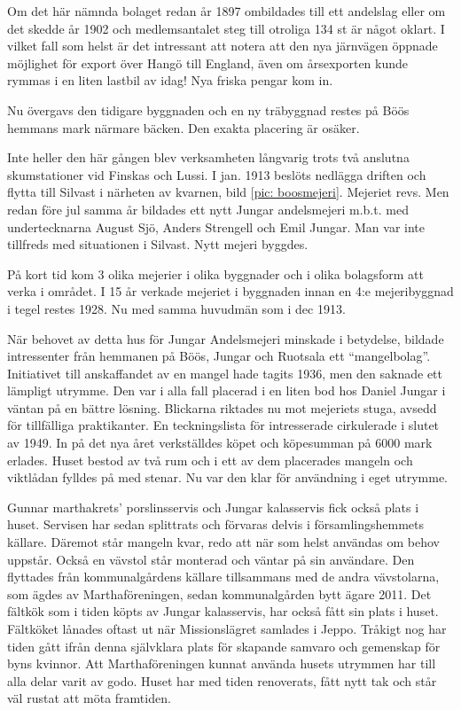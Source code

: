 Om det här nämnda bolaget redan år 1897 ombildades till ett andelslag eller om det skedde år 1902 och medlemsantalet steg till otroliga 134 st är något oklart. I vilket fall som helst är det intressant att notera att den nya järnvägen öppnade möjlighet för export över Hangö till England, även om årsexporten kunde rymmas i en liten lastbil av idag! Nya friska pengar kom in.

Nu övergavs den tidigare byggnaden och en ny träbyggnad restes på Böös hemmans mark närmare bäcken. Den exakta placering är osäker.

Inte heller den här gången blev verksamheten långvarig trots två anslutna skumstationer vid Finskas och Lussi. I jan. 1913 beslöts nedlägga driften och flytta till Silvast i närheten av kvarnen, bild \ref{pic: boosmejeri}. Mejeriet revs. Men redan före jul samma år bildades ett nytt Jungar andelsmejeri m.b.t. med undertecknarna August Sjö, Anders Strengell och Emil Jungar. Man var inte tillfreds med situationen i Silvast. Nytt mejeri byggdes.

På kort tid kom 3 olika mejerier i olika byggnader och i olika bolagsform att verka i området. I 15 år verkade mejeriet i byggnaden innan en 4:e mejeribyggnad i tegel restes 1928. Nu med samma huvudmän som i dec 1913.







När behovet av detta hus för Jungar Andelsmejeri minskade i betydelse, bildade intressenter från hemmanen på Böös, Jungar och Ruotsala ett ``mangelbolag''. Initiativet till anskaffandet av en mangel hade tagits 1936, men den saknade ett lämpligt utrymme. Den var i alla fall placerad i en liten bod hos Daniel Jungar i väntan på en bättre lösning. Blickarna riktades nu mot mejeriets stuga, avsedd för tillfälliga praktikanter. En teckningslista för intresserade cirkulerade i slutet av 1949. In på det nya året verkställdes köpet och köpesumman på 6000 mark erlades. Huset bestod av två rum och i ett av dem placerades mangeln och viktlådan fylldes på med stenar. Nu var den klar för användning i eget utrymme.

Gunnar marthakrets' porslinsservis och Jungar kalasservis fick också plats i huset. Servisen har sedan splittrats och förvaras delvis i församlingshemmets källare. Däremot står mangeln kvar, redo att när som helst användas om behov uppstår. Också en vävstol står monterad och väntar på sin användare. Den flyttades från kommunalgårdens källare tillsammans med de andra vävstolarna, som ägdes av Marthaföreningen, sedan kommunalgården bytt ägare 2011. Det fältkök som i tiden köpts av Jungar kalasservis, har också fått sin plats i huset. Fältköket lånades oftast ut när Missionslägret samlades i Jeppo. Tråkigt nog har tiden gått ifrån denna självklara plats för skapande samvaro och gemenskap för byns kvinnor. Att Marthaföreningen kunnat använda husets utrymmen har till alla delar varit av godo. Huset har med tiden renoverats, fått nytt tak och står väl rustat att möta framtiden.


